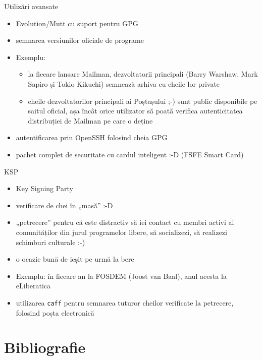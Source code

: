 \documentclass{beamer}
\begin{document}
\begin{frame}{Utilizări avansate}
  \begin{itemize}
    \item Evolution/Mutt cu suport pentru GPG
    \item semnarea versiunilor oficiale de programe
    \item Exemplu:
    \begin{itemize}
      \item la fiecare lansare Mailman, dezvoltatorii principali (Barry
      Warshaw, Mark Sapiro și Tokio Kikuchi) semnează arhiva cu cheile lor
      private
      \item cheile dezvoltatorilor principali ai Poștașului ;-) sunt
      public disponibile pe saitul oficial, așa încât orice utilizator să
      poată verifica autenticitatea distribuției de Mailman pe care o deține
    \end{itemize}
    \item autentificarea prin OpenSSH folosind cheia GPG
    \item pachet complet de securitate cu cardul inteligent :-D (FSFE Smart
    Card)
  \end{itemize}
\end{frame}

\begin{frame}{KSP}
  \begin{itemize}
    \item Key Signing Party
    \item verificare de chei în „masă” :-D
    \item „petrecere” pentru că este distractiv să iei contact cu membri
    activi ai comunităților din jurul programelor libere, să socializezi,
    să realizezi schimburi culturale :-)
    \item o ocazie bună de ieșit pe urmă la bere
    \item Exemplu: în fiecare an la FOSDEM (Joost van Baal), anul acesta la
    eLiberatica
    \item utilizarea \texttt{caff} pentru semnarea tuturor cheilor verificate
    la petrecere, folosind poșta electronică
  \end{itemize}
\end{frame}

\section{Bibliografie}
\frame{\tableofcontents[currentsection]}
\end{document}
